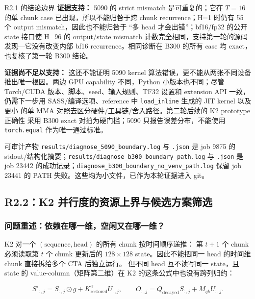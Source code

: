 \documentclass[11pt,a4paper,fontset=none]{ctexart}
\newcommand{\code}[1]{\texttt{#1}}
\begin{document}
\begin{decision}{R2.1 的结论边界}
\textbf{证据支持：} 5090 的 strict mismatch 是可重复的；它在 \(T=16\) 的单
chunk case 已出现，所以不能归咎于跨 chunk recurrence；H=1 时仍有 55 个
output mismatch，因此也不能归咎于 ``多 head 才会出错''；bf16/fp32 的公开
state 接口使 H=96 的 output/state mismatch 计数完全相同，支持第一轮的源码
发现---它没有改变内部 bf16 recurrence。相同诊断在 B300 的所有 case 均 exact，
也复核了第一轮 B300 结论。

\textbf{证据尚不足以支持：} 这还不能证明 5090 kernel 算法错误，更不能从两张不同设备
推出唯一根因。两边 GPU capability 不同，Python 小版本也不同；尽管 Torch/CUDA
版本、脚本、seed、输入规则、TF32 设置和 extension API 一致，仍需下一步用
SASS/编译选项、reference 中 \code{load\_inline} 生成的 JIT kernel 以及更小
的单 MMA 对照去区分硬件/工具链/舍入路径。第二轮后续的 K2 prototype 正确性
采用 B300 exact 对拍为硬门槛；5090 只报告误差分布，不能使用 \code{torch.equal}
作为唯一通过标准。
\end{decision}

\begin{record}{可审计产物}
\code{results/diagnose\_5090\_boundary.log} 与 \code{.json} 是 job 9875 的
stdout/结构化摘要；\code{results/diagnose\_b300\_boundary\_path.log} 与
\code{.json} 是 job 23442 的成功记录；\code{diagnose\_b300\_boundary\_no\_venv\_path.log}
保留 job 23441 的 PATH 失败。这些均为小文件，已作为本轮证据进入 git。
\end{record}

\subsection{R2.2：K2 并行度的资源上界与候选方案筛选}

\subsubsection{问题重述：依赖在哪一维，空闲又在哪一维？}

K2 对一个 \((\text{sequence},\text{head})\) 的所有 chunk 按时间顺序递推：
第 \(t+1\) 个 chunk 必须读取第 \(t\) 个 chunk 更新后的 \(128\times128\)
state。因此不能把同一 head 的时间维 chunk 直接拆给多个 CTA 后独立运行。
但不同 head 互不读写同一 state，且 state 的 value-column（矩阵第二维）在
K2 的这条公式中也没有跨列归约：

\[
  S'_{:,j}=S_{:,j}\odot g + K_{\mathrm{restored}}^\mathsf{T}U_{:,j},
  \qquad
  O_{:,j}=Q_{\mathrm{decayed}}S_{:,j}+M_{qk}U_{:,j}.
\]
\end{document}

